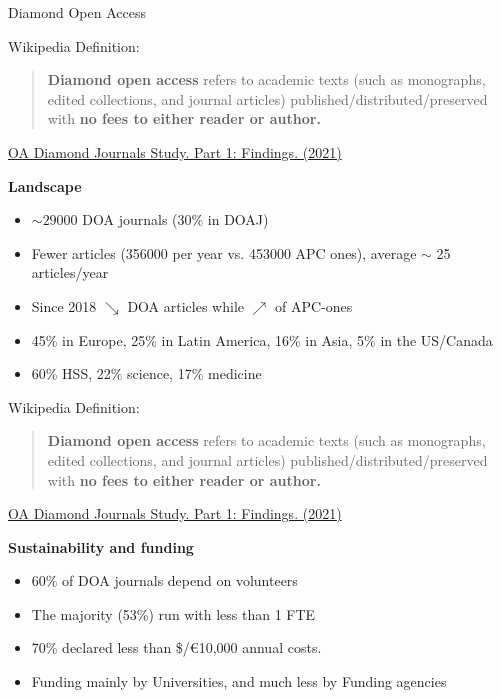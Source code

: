 \documentclass[10pt,compress,serif,aspectratio=169]{beamer}
\begin{document}
\begin{frame}[t]{Diamond Open Access}

Wikipedia Definition:\newline \newline
 \begin{quote}
   \textbf{Diamond open access} refers to academic texts (such as monographs, edited collections, and journal articles) published/distributed/preserved with \textbf{no fees to either reader or author.} \newline
 \end{quote}
 \pause
\href{https://doi.org/10.5281/zenodo.4558704}{OA Diamond Journals Study. Part 1: Findings. (2021)\newline}

\textbf{Landscape}\\
\begin{itemize}
\item $\sim 29000$ DOA journals (30\% in DOAJ)
\item Fewer articles (356000 per year vs. 453000 APC ones), average $\sim$ 25 articles/year
\item Since 2018 $\searrow$ DOA articles while $\nearrow$ of APC-ones
\item 45\% in Europe, 25\% in Latin America, 16\% in Asia, 5\% in the US/Canada
\item 60\% HSS, 22\% science, 17\% medicine
\end{itemize}

\end{frame}


\begin{frame}[t]%
 \vskip1cm%

Wikipedia Definition:\newline \newline
 \begin{quote}
   \textbf{Diamond open access} refers to academic texts (such as monographs, edited collections, and journal articles) published/distributed/preserved with \textbf{no fees to either reader or author.} \newline
 \end{quote}

\href{https://doi.org/10.5281/zenodo.4558704}{OA Diamond Journals Study. Part 1: Findings. (2021)\newline}

\textbf{Sustainability and funding}\\
\begin{itemize}
  \item 60\% of DOA journals depend on volunteers
  \item The majority (53\%) run with less than 1 FTE
  \item 70\% declared less than \$/€10,000 annual costs.
  \item Funding mainly by Universities, and much less by Funding agencies
\end{itemize}
\end{frame}
\end{document}
